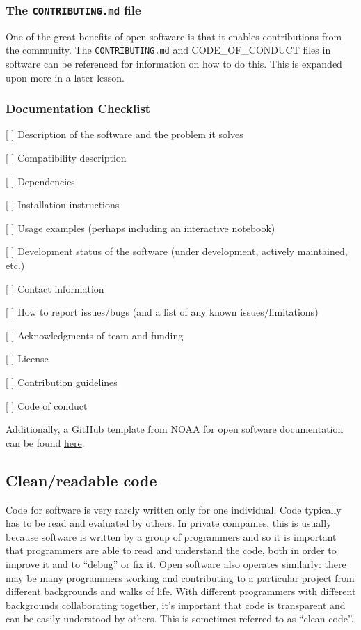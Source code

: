 \documentclass[
  letterpaper,
  DIV=11,
  numbers=noendperiod]{scrreport}
\begin{document}
\hypertarget{the-contributing.md-file}{%
\subsubsection{\texorpdfstring{The \texttt{CONTRIBUTING.md}
file}{The CONTRIBUTING.md file}}\label{the-contributing.md-file}}

One of the great benefits of open software is that it enables
contributions from the community. The \texttt{CONTRIBUTING.md} and
CODE\_OF\_CONDUCT files in software can be referenced for information on
how to do this. This is expanded upon more in a later lesson.

\hypertarget{documentation-checklist}{%
\subsubsection{Documentation Checklist}\label{documentation-checklist}}

{[} {]} Description of the software and the problem it solves

{[} {]} Compatibility description

{[} {]} Dependencies

{[} {]} Installation instructions

{[} {]} Usage examples (perhaps including an interactive notebook)

{[} {]} Development status of the software (under development, actively
maintained, etc.)

{[} {]} Contact information

{[} {]} How to report issues/bugs (and a list of any known
issues/limitations)

{[} {]} Acknowledgments of team and funding

{[} {]} License

{[} {]} Contribution guidelines

{[} {]} Code of conduct

Additionally, a GitHub template from NOAA for open software
documentation can be found
\href{https://github.com/NOAA-OWP/owp-open-source-project-template}{here}.

\hypertarget{cleanreadable-code}{%
\subsection{Clean/readable code}\label{cleanreadable-code}}

Code for software is very rarely written only for one individual. Code
typically has to be read and evaluated by others. In private companies,
this is usually because software is written by a group of programmers
and so it is important that programmers are able to read and understand
the code, both in order to improve it and to ``debug'' or fix it. Open
software also operates similarly: there may be many programmers working
and contributing to a particular project from different backgrounds and
walks of life. With different programmers with different backgrounds
collaborating together, it's important that code is transparent and can
be easily understood by others. This is sometimes referred to as ``clean
code''.
\end{document}
